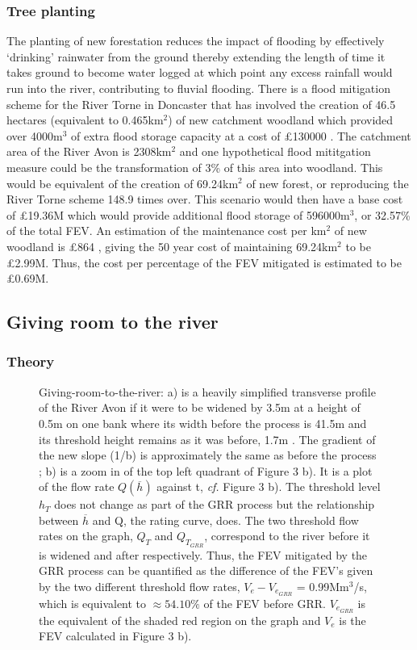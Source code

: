 \documentclass[11pt,a4paper]{article}
\begin{document}
\subsubsection{Tree planting}
The planting of new forestation reduces the impact of flooding by effectively `drinking' rainwater from the ground thereby extending the length of time it takes ground to become water logged at which point any excess rainfall would run into the river, contributing to fluvial flooding. There is a flood mitigation scheme for the River Torne in Doncaster that has involved the creation of 46.5 hectares (equivalent to 0.465km$^2$) of new catchment woodland which provided over 4000m$^3$ of extra flood storage capacity at a cost of \pounds130000 \cite{nfm}. The catchment area of the River Avon is 2308km$^2$ \cite{britannica} and one hypothetical flood mititgation measure could be the transformation of 3\% of this area into woodland. This would be equivalent of the creation of 69.24km$^2$ of new forest, or reproducing the River Torne scheme 148.9 times over. This scenario would then have a base cost of \pounds19.36M which would provide additional flood storage of 596000m$^3$, or 32.57\% of the total FEV. An estimation of the maintenance cost per km$^2$ of new woodland is \pounds864 \cite{cost1}, giving the 50 year cost of maintaining 69.24km$^2$ to be \pounds2.99M. Thus, the cost per percentage of the FEV mitigated is estimated to be \pounds0.69M.

\subsection{Giving room to the river}
\subsubsection{Theory}
\begin{figure}[ht!]
\begin{center}
\hfill
{}
\caption{Giving-room-to-the-river: a) is a heavily simplified transverse profile of the River Avon if it were to be widened by 3.5m at a height of 0.5m on one bank where its width before the process is 41.5m and its threshold height remains as it was before, 1.7m \cite{maps}. The gradient of the new slope (1/b) is approximately the same as before the process {;} b) is a zoom in of the top left quadrant of Figure 3 b). It is a plot of the flow rate $Q(\overline{h})$ against t, \textit{cf.} Figure 3 b). The threshold level $h_T$ does not change as part of the GRR process but the relationship between $\overline{h}$ and Q, the rating curve, does. The two threshold flow rates on the graph, $Q_{T}$ and $Q_{T_{GRR}}$, correspond to the river before it is widened and after respectively. Thus, the FEV mitigated by the GRR process can be quantified as the difference of the FEV's given by the two different threshold flow rates, $V_{e}-V_{e_{GRR}}$ = 0.99Mm$^3$/s, which is equivalent to $\approx 54.10\%$ of the FEV before GRR. $V_{e_{GRR}}$ is the equivalent of the shaded red region on the graph and $V_{e}$ is the FEV calculated in Figure 3 b).}
\end{center}
\end{figure}
\end{document}

